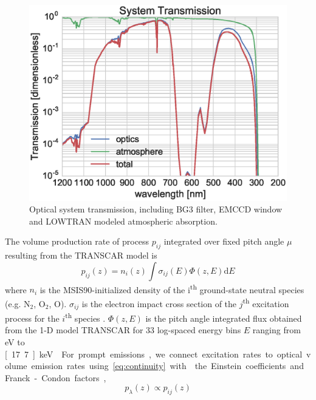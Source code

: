 \begin{figure}\centering
    \includegraphics[width=\columnwidth,trim=5 5 5 5,clip]{gfx/hirsc8}
    \caption{Optical system transmission, including BG3 filter, EMCCD window and LOWTRAN modeled atmospheric absorption.}\label{fig:optTrans}
\end{figure}
%
The volume production rate of process $p_{ij}$ integrated over fixed pitch angle $\mu$ resulting from the TRANSCAR model is 
\begin{equation}\label{eq:prodEq2}
p_{ij}(z) =n_i(z) \int \sigma_{ij}(E)\Phi(z,E)\textrm{d}E 
\end{equation}
where $n_i$ is the MSIS90-initialized density of the i\textsuperscript{th} ground-state neutral species (e.g. N$_2$, O$_2$, O). $\sigma_{ij}$ is the electron impact cross section of the $j$\textsuperscript{th} excitation process for the $i$\textsuperscript{th} species \citep{semeter2012}. 
$\Phi(z,E)$ is the pitch angle integrated flux obtained from the 1-D model TRANSCAR \citep{blelly1996a} for 33 log-spaced energy bins $E$ ranging from \unit[58]{eV} to \unit[17.7]{keV} \citep{dahlgren2013}. 
For prompt emissions, we connect excitation rates to optical volume emission rates using~\eqref{eq:continuity} with \citep{zettdis,vallancejones1974} the Einstein coefficients and Franck-Condon factors,
\begin{equation}\label{eq:prompt4}
p_\lambda(z) \propto p_{ij}(z)
\end{equation}

